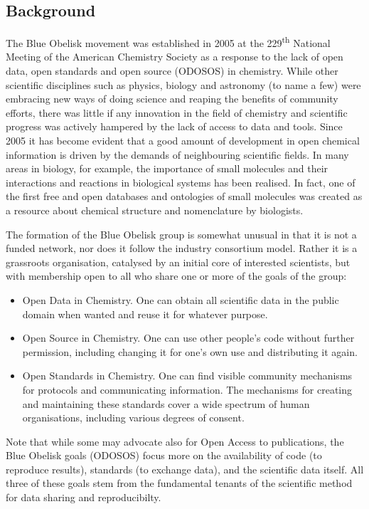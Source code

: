 \documentclass[10pt]{bmc_article}
\newenvironment{bmcformat}{\begin{raggedright}\baselineskip20pt\sloppy\setboolean{publ}{false}}{\end{raggedright}\baselineskip20pt\sloppy}
\begin{document}
\begin{bmcformat}
\section*{Background}
The Blue Obelisk movement was established in 2005 at the
229\textsuperscript{th} National Meeting of the American Chemistry
Society as a response to the lack of open data, open standards and
open source (ODOSOS) in chemistry. While other scientific disciplines
such as physics, biology and astronomy (to name a few) were embracing
new ways of doing science and reaping the benefits of community
efforts, there was little if any innovation in the field of chemistry
and scientific progress was actively hampered by the lack of access to
data and tools.
Since 2005 it has become evident that a good amount of development in open
chemical information is driven by the demands of neighbouring
scientific fields. In many areas in biology, for example, the importance of
small molecules and their interactions and reactions in biological systems
has been realised. In fact, one of the first free and open databases and ontologies
of small molecules was created as a resource about chemical structure and nomenclature
by biologists.\cite{DeMatos:2009p3839}

The formation of the Blue Obelisk group is somewhat unusual in that it
is not a funded network, nor does it follow the industry consortium
model. Rather it is a grassroots organisation, catalysed by an initial
core of interested scientists, but with membership open to all who
share one or more of the goals of the group:
\begin{itemize}
\item Open Data in Chemistry. One can obtain all scientific data in the public domain when
wanted and reuse it for whatever purpose.
\item Open Source in Chemistry. One can use other people's code without further
permission, including changing it for one's own use and distributing
it again.
\item Open Standards in Chemistry. One can find visible community mechanisms for
protocols and communicating information. The mechanisms for creating
and maintaining these standards cover a wide spectrum of human
organisations, including various degrees of consent.
\end{itemize}

Note that while some may advocate also for Open Access to
publications, the Blue Obelisk goals (ODOSOS) focus more on the availability of code (to
reproduce results), standards (to exchange data), and the scientific
data itself. All three of these goals stem from the fundamental
tenants of the scientific method for data sharing and reproducibilty.


\end{bmcformat}
\end{document}
